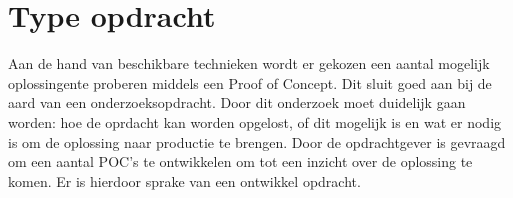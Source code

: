 \section{Type opdracht}

Aan de hand van beschikbare technieken wordt er gekozen een aantal mogelijk oplossingen\newline te proberen middels een Proof of Concept. Dit sluit goed aan bij de aard van een onderzoeksopdracht. Door dit onderzoek moet duidelijk gaan worden: hoe de oprdacht kan worden opgelost, of dit mogelijk is en wat er nodig is om de oplossing naar productie te brengen. Door de opdrachtgever is gevraagd om een aantal POC's te ontwikkelen om tot een inzicht over de oplossing te komen. Er is hierdoor sprake van een ontwikkel opdracht.

